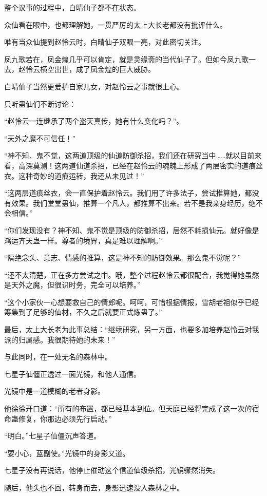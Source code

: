 \begin{this_body}
整个议事的过程中，白晴仙子都不在状态。

众仙看在眼中，也都理解她，一贯严厉的太上大长老都没有批评什么。

唯有当众仙提到赵怜云时，白晴仙子双眼一亮，对此密切关注。

凤九歌若在，凤金煌几乎可以肯定，就是灵缘斋的当代仙子了。但如今凤九歌一去，赵怜云横空出世，成了凤金煌的巨大威胁。

白晴仙子当然更爱护自家儿女，对赵怜云之事就很上心。

只听蛊仙们不断讨论：

“赵怜云一连继承了两个盗天真传，她有什么变化吗？”。

“天外之魔不可信任！”

“神不知、鬼不觉，这两道顶级的仙道防御杀招，我们还在研究当中……就以目前来看，高深莫测！这两道仙道杀招，已经在赵怜云的魂魄上形成了两层密实的道痕丝衣。这种奇妙的道痕运转，我还从未见过！”

“这两层道痕丝衣，会一直保护着赵怜云。我们用了许多法子，尝试推算她，都没有效果。我们堂堂蛊仙，推算一个凡人，都推算不出来。若不是我亲身经历，绝不会相信。”

“你们发现没有？神不知、鬼不觉是顶级的防御杀招，居然不耗损仙元。就好像是鸿运齐天蛊一样。尊者的境界，真是难以理解啊。”

“隔绝念头、意志、情感的推算，这是神不知的防御效果。那么鬼不觉呢？”

“还不太清楚，正在多方尝试之中。哦，整个过程赵怜云都很配合，我觉得她虽然是天外之魔，但很识时务，完全可以培养。”

“这个小家伙一心想要救自己的情郎呢。呵呵，可惜根据情报，雪胡老祖似乎已经筹集到了足够的仙材，不久之后就要正式炼蛊了。”

最后，太上大长老为此事总结：“继续研究，另一方面，也要多加培养赵怜云对我派的归属感。我很期待她的未来！”

与此同时，在一处无名的森林中。

七星子仙僵正透过一面光镜，和他人通信。

光镜中是一道模糊的老者身影。

他徐徐开口道：“所有的布置，都已经基本到位。但天庭已经将完成了这一次的宿命蛊修复，你那边必须先行启动。”

“明白。”七星子仙僵沉声答道。

“要小心，蓝副使。”光镜中的身影又道。

七星子没有再说话，他停止催动这个信道仙级杀招，光镜骤然消失。

随后，他头也不回，转身而去，身影迅速没入森林之中。

\end{this_body}

